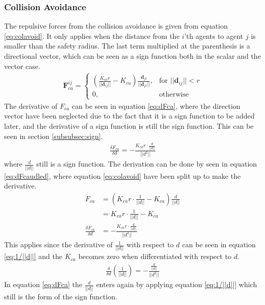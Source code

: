 \subsubsection{Collision Avoidance}
The repulsive forces from the collision avoidance is given from equation \ref{eq:colavoid}. It only applies when the distance from the $i$'th agents to agent $j$ is smaller than the safety radius. The last term multiplied at the parenthesis is a directional vector, which can be seen as a sign function both in the scalar and the vector case.
\begin{align}
    \mathbf{F}_{ca}^{ij}= 
\begin{cases}
    \left(
    \frac{K_{ca}r}{||\mathbf{d}_{ij}||}-K_{ca}
    \right)
    \frac{\mathbf{d}_{ji}}{||\mathbf{d}_{ji}||}
    ,& \text{for } ||\mathbf{d}_{ij}||<r\\
    0,              & \text{otherwise}
\end{cases}
\label{eq:colavoid}
\end{align}
The derivative of $F_{ca}$ can be seen in equation \ref{eq:dFca},
where the direction vector have been neglected due to the fact that it
is a sign function to be added later, and the derivative of a sign
function is still the sign function. This can be seen in section
\vref{subsubsec:sign}.
\begin{align}
\frac{\delta F_{ca}}{\delta d} = -\frac{K_{ca}r\cdot \frac{d}{||d||}}{||d^2||}
\label{eq:dFca}
\end{align}
where $\frac{d}{||d||}$ still is a sign function.
The derivation can be done by seen in equation \ref{eq:dFcaudled}, where equation \ref{eq:colavoid} have been split up to make the derivative.
\begin{subequations}
\begin{align}
F_{ca} &= \left(K_{ca}r\cdot \frac{1}{||d||} - K_{ca}\right)\frac{d}{||d||}\\
&= K_{ca}r\cdot \frac{1}{||d||} - K_{ca}\\
\frac{\delta F_{ca}}{\delta d} &= -\frac{K_{ca}r\cdot \frac{d}{||d||}}{||d^2||}
\end{align}
\label{eq:dFcaudled}
\end{subequations}
This applies since the derivative of $\frac{1}{||d||}$ with respect to $d$ can be seen in equation \ref{eq:1/||d||} and the $K_{ca}$ becomes zero when differentiated with respect to $d$.
\begin{align}
\frac{\delta}{\delta d}\left(\frac{1}{||d||}\right) = -\frac{\frac{d}{||d||}}{||d^2||}
\label{eq:1/||d||}
\end{align}
In equation \ref{eq:dFca} the $\frac{d}{||d||}$ enters again by applying equation \ref{eq:1/||d||} which still is the form of the sign function.

